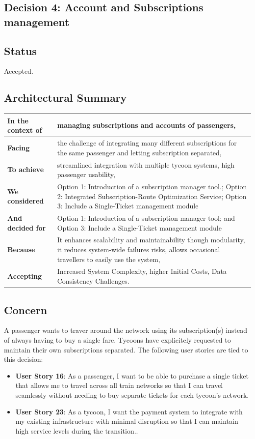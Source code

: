 \subsection{Decision 4: Account and Subscriptions management}

\subsection*{Status}
Accepted.

\subsection*{Architectural Summary}
\begin{tabular}{|p{3.5cm}|p{10.5cm}|}
    \hline
    \textbf{In the context of} & managing subscriptions and accounts of passengers, \\
    \hline
    \textbf{Facing} & the challenge of integrating many different subscriptions for the same passenger and letting subscription separated, \\
    \hline
    \textbf{To achieve} & streamlined integration with multiple tycoon systems, high passenger usability, \\
    \hline
    \textbf{We considered} & Option 1: Introduction of a subscription manager tool.; Option 2: Integrated Subscription-Route Optimization Service; Option 3: Include a Single-Ticket management module\\
    \hline
    \textbf{And decided for} & Option 1: Introduction of a subscription manager tool; and Option 3: Include a Single-Ticket management module  \\
    \hline
    \textbf{Because} & It enhances scalability and maintainability though modularity, it reduces system-wide failures risks, allows occasional travellers to easily use the system, \\
    \hline
    \textbf{Accepting} & Increased System Complexity, higher Initial Costs, Data Consistency Challenges. \\
    \hline
\end{tabular}

\subsection*{Concern}
A passenger wants to traver around the network using its subscription(s) instead of always having to buy a single fare.
Tycoons have explicitely requested to maintain their own subscriptions separated.
The following user stories are tied to this decision:
\begin{itemize}
    \item \textbf{User Story 16}: As a passenger, I want to be able to purchase a single ticket that allows me to travel across all train networks so that I can travel seamlessly without needing to buy separate tickets for each tycoon's network.
    \item \textbf{User Story 23}: As a tycoon, I want the payment system to integrate with my existing infrastructure with minimal disruption so that I can maintain high service levels during the transition..
\end{itemize}

